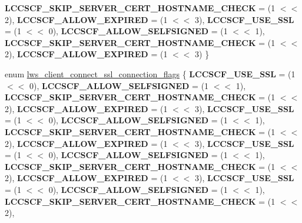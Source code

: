 \begin{DoxyCompactItemize}
{\bfseries L\+C\+C\+S\+C\+F\+\_\+\+S\+K\+I\+P\+\_\+\+S\+E\+R\+V\+E\+R\+\_\+\+C\+E\+R\+T\+\_\+\+H\+O\+S\+T\+N\+A\+M\+E\+\_\+\+C\+H\+E\+CK} = (1 $<$$<$ 2), 
{\bfseries L\+C\+C\+S\+C\+F\+\_\+\+A\+L\+L\+O\+W\+\_\+\+E\+X\+P\+I\+R\+ED} = (1 $<$$<$ 3), 
{\bfseries L\+C\+C\+S\+C\+F\+\_\+\+U\+S\+E\+\_\+\+S\+SL} = (1 $<$$<$ 0), 
{\bfseries L\+C\+C\+S\+C\+F\+\_\+\+A\+L\+L\+O\+W\+\_\+\+S\+E\+L\+F\+S\+I\+G\+N\+ED} = (1 $<$$<$ 1), 
\newline
{\bfseries L\+C\+C\+S\+C\+F\+\_\+\+S\+K\+I\+P\+\_\+\+S\+E\+R\+V\+E\+R\+\_\+\+C\+E\+R\+T\+\_\+\+H\+O\+S\+T\+N\+A\+M\+E\+\_\+\+C\+H\+E\+CK} = (1 $<$$<$ 2), 
{\bfseries L\+C\+C\+S\+C\+F\+\_\+\+A\+L\+L\+O\+W\+\_\+\+E\+X\+P\+I\+R\+ED} = (1 $<$$<$ 3)
 \}
\item 
enum \hyperlink{group__client_ga96f3dbad54b2853969cfa933d66871ce}{lws\+\_\+client\+\_\+connect\+\_\+ssl\+\_\+connection\+\_\+flags} \{ \newline
{\bfseries L\+C\+C\+S\+C\+F\+\_\+\+U\+S\+E\+\_\+\+S\+SL} = (1 $<$$<$ 0), 
{\bfseries L\+C\+C\+S\+C\+F\+\_\+\+A\+L\+L\+O\+W\+\_\+\+S\+E\+L\+F\+S\+I\+G\+N\+ED} = (1 $<$$<$ 1), 
{\bfseries L\+C\+C\+S\+C\+F\+\_\+\+S\+K\+I\+P\+\_\+\+S\+E\+R\+V\+E\+R\+\_\+\+C\+E\+R\+T\+\_\+\+H\+O\+S\+T\+N\+A\+M\+E\+\_\+\+C\+H\+E\+CK} = (1 $<$$<$ 2), 
{\bfseries L\+C\+C\+S\+C\+F\+\_\+\+A\+L\+L\+O\+W\+\_\+\+E\+X\+P\+I\+R\+ED} = (1 $<$$<$ 3), 
\newline
{\bfseries L\+C\+C\+S\+C\+F\+\_\+\+U\+S\+E\+\_\+\+S\+SL} = (1 $<$$<$ 0), 
{\bfseries L\+C\+C\+S\+C\+F\+\_\+\+A\+L\+L\+O\+W\+\_\+\+S\+E\+L\+F\+S\+I\+G\+N\+ED} = (1 $<$$<$ 1), 
{\bfseries L\+C\+C\+S\+C\+F\+\_\+\+S\+K\+I\+P\+\_\+\+S\+E\+R\+V\+E\+R\+\_\+\+C\+E\+R\+T\+\_\+\+H\+O\+S\+T\+N\+A\+M\+E\+\_\+\+C\+H\+E\+CK} = (1 $<$$<$ 2), 
{\bfseries L\+C\+C\+S\+C\+F\+\_\+\+A\+L\+L\+O\+W\+\_\+\+E\+X\+P\+I\+R\+ED} = (1 $<$$<$ 3), 
\newline
{\bfseries L\+C\+C\+S\+C\+F\+\_\+\+U\+S\+E\+\_\+\+S\+SL} = (1 $<$$<$ 0), 
{\bfseries L\+C\+C\+S\+C\+F\+\_\+\+A\+L\+L\+O\+W\+\_\+\+S\+E\+L\+F\+S\+I\+G\+N\+ED} = (1 $<$$<$ 1), 
{\bfseries L\+C\+C\+S\+C\+F\+\_\+\+S\+K\+I\+P\+\_\+\+S\+E\+R\+V\+E\+R\+\_\+\+C\+E\+R\+T\+\_\+\+H\+O\+S\+T\+N\+A\+M\+E\+\_\+\+C\+H\+E\+CK} = (1 $<$$<$ 2), 
{\bfseries L\+C\+C\+S\+C\+F\+\_\+\+A\+L\+L\+O\+W\+\_\+\+E\+X\+P\+I\+R\+ED} = (1 $<$$<$ 3), 
\newline
{\bfseries L\+C\+C\+S\+C\+F\+\_\+\+U\+S\+E\+\_\+\+S\+SL} = (1 $<$$<$ 0), 
{\bfseries L\+C\+C\+S\+C\+F\+\_\+\+A\+L\+L\+O\+W\+\_\+\+S\+E\+L\+F\+S\+I\+G\+N\+ED} = (1 $<$$<$ 1), 
{\bfseries L\+C\+C\+S\+C\+F\+\_\+\+S\+K\+I\+P\+\_\+\+S\+E\+R\+V\+E\+R\+\_\+\+C\+E\+R\+T\+\_\+\+H\+O\+S\+T\+N\+A\+M\+E\+\_\+\+C\+H\+E\+CK} = (1 $<$$<$ 2), 
$$
\end{DoxyCompactItemize}
